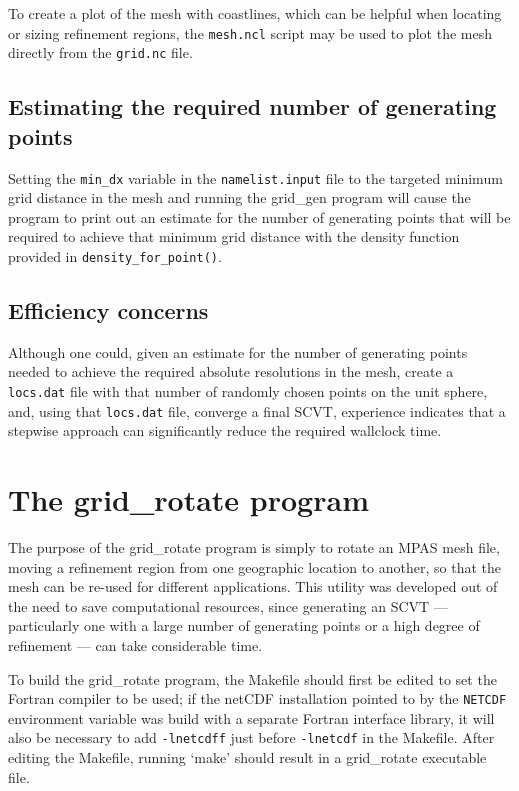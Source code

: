 \documentclass[11pt]{report}
\begin{document}
To create a plot of the mesh with coastlines, which can be helpful when locating or sizing refinement regions, the {\tt mesh.ncl} script may be used to plot the mesh directly from                 
the {\tt grid.nc} file.                                                                          

\subsection{Estimating the required number of generating points}
\label{sec:estimating_np}

Setting the {\tt min\_dx} variable in the {\tt namelist.input} file to the targeted minimum grid distance in the mesh and running the grid\_gen program will cause the program to print out an estimate for the number of generating points that will be required to achieve that minimum grid distance with the density function provided in {\tt density\_for\_point()}.

\subsection{Efficiency concerns}
\label{sec:grid_gen_efficiency}

Although one could, given an estimate for the number of generating points needed to achieve the required absolute resolutions in the mesh,
create a {\tt locs.dat} file with that number of randomly chosen points on the unit sphere, and, using that {\tt locs.dat} file, converge a final SCVT, 
experience indicates that a stepwise approach can significantly reduce the required wallclock time.                   

   
\section{The grid\_rotate program} 
\label{sec:grid_rotate} 

The purpose of the grid\_rotate program is simply to rotate an MPAS mesh file, moving a refinement region from one geographic location to another, so that the mesh can be re-used for different applications. This utility was developed out of the need to save computational resources, since generating an SCVT --- particularly one with a large number of generating points or a high degree of refinement --- can take considerable time.

To build the grid\_rotate program, the Makefile should first be edited to set the Fortran compiler to be used; if the netCDF installation pointed to by the {\tt NETCDF} environment variable was build with a separate Fortran interface library, it will also be necessary to add {\tt -lnetcdff} just before {\tt -lnetcdf} in the Makefile. After editing the Makefile, running `make' should result in a grid\_rotate executable file.
\end{document}
